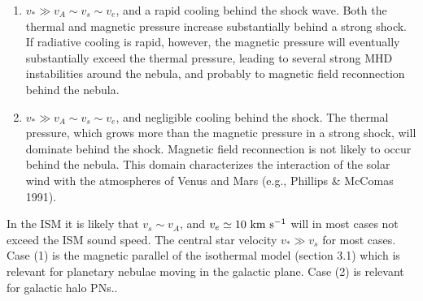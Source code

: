 \begin{enumerate}
\item $v_\ast \gg v_A \sim v_s \sim v_e$, and a rapid cooling behind the
shock wave.
Both the thermal and magnetic pressure increase substantially behind
a strong shock. If radiative cooling is rapid, however, the magnetic pressure
will eventually substantially exceed the thermal pressure, leading to
several strong MHD instabilities around the nebula, and probably to
magnetic field reconnection behind the nebula. 

\item $v_\ast \gg v_A \sim v_s \sim v_e$, and negligible cooling behind the
shock. The thermal pressure, which grows more than the magnetic pressure in a
strong shock, will dominate behind the shock.
 Magnetic field reconnection is not likely to occur behind the nebula.
This domain characterizes the interaction of the solar wind with
the atmospheres of Venus and Mars (e.g., Phillips \& McComas 1991). 
\end{enumerate}

In the ISM it is likely that $v_s \sim v_A$, and
$v_e \simeq 10 ~\rm{km} ~\rm{s}^{-1}$ will in most cases not exceed the ISM sound speed.
The central star velocity $v_\ast \gg v_s$ for most cases.
Case (1) is the magnetic parallel of the isothermal model (section 3.1)
which is relevant for planetary nebulae moving in the galactic plane.
Case (2) is relevant for galactic halo PNs..

